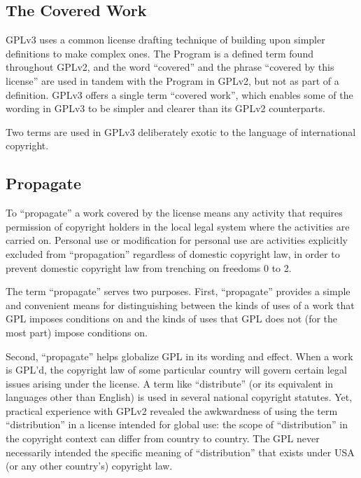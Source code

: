 \subsection{The Covered Work}

GPLv3 uses a common license drafting technique of building upon simpler
definitions to make complex ones.  The Program is a defined term found
throughout GPLv2, and the word ``covered'' and the phrase ``covered by this
license'' are used in tandem with the Program in GPLv2, but not as part of a
definition.  GPLv3 offers a single term ``covered work'', which enables some
of the wording in GPLv3 to be simpler and clearer than its GPLv2
counterparts.


Two terms are used in GPLv3 deliberately exotic to the language of
international copyright.

\subsection{Propagate}


To ``propagate'' a work covered by the license means any activity that
requires permission of copyright holders in the local legal system where the
activities are carried on. Personal use or modification for personal use are
activities explicitly excluded from ``propagation'' regardless of domestic
copyright law, in order to prevent domestic copyright law from trenching on
freedoms 0 to 2.

The term ``propagate'' serves two purposes.  First, ``propagate'' provides a
simple and convenient means for distinguishing between the kinds of uses of a
work that GPL imposes conditions on and the kinds of uses that GPL does not
(for the most part) impose conditions on.

Second, ``propagate'' helps globalize GPL in its wording and effect.  When a
work is GPL'd, the copyright law of some particular country will govern
certain legal issues arising under the license.  A term like ``distribute''
(or its equivalent in languages other than English) is used in several
national copyright statutes.  Yet, practical experience with GPLv2 revealed
the awkwardness of using the term ``distribution'' in a license intended for
global use: the scope of ``distribution'' in the copyright context can differ
from country to country.  The GPL never necessarily intended the specific
meaning of ``distribution'' that exists under USA (or any other country's)
copyright law.

